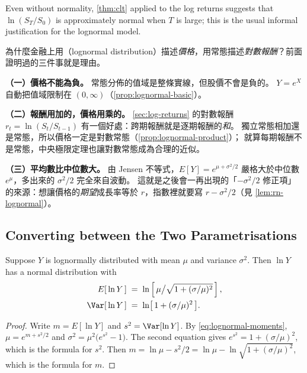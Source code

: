 Even without normality, \autoref{thm:clt} applied to the log returns suggests that $\ln(S_{T}/S_{0})$ is approximately normal when $T$ is large; this is the usual informal justification for the lognormal model.

\begin{remark}
	為什麼金融上用（lognormal distribution）描述\emph{價格}，用常態描述\emph{對數報酬}？前面證明過的三件事就是理由。

	\textbf{（一）價格不能為負。}
	常態分佈的值域是整條實線，但股價不會是負的。
	$Y=e^{X}$ 自動把值域限制在 $(0,\infty)$（\autoref{prop:lognormal-basic}）。

	\textbf{（二）報酬用加的，價格用乘的。}
	\autoref{sec:log-returns} 的對數報酬 $r_{t}=\ln(S_{t}/S_{t-1})$ 有一個好處：跨期報酬就是逐期報酬的\emph{和}。
	獨立常態相加還是常態，所以價格一定是對數常態（\autoref{prop:lognormal-product}）；
	就算每期報酬不是常態，中央極限定理也讓對數常態成為合理的近似。

	\textbf{（三）平均數比中位數大。}
	由 Jensen 不等式，$E[Y]=e^{\mu+\sigma^{2}/2}$ 嚴格大於中位數 $e^{\mu}$，多出來的 $\sigma^{2}/2$ 完全來自波動。
	這就是之後會一再出現的「$-\sigma^{2}/2$ 修正項」的來源：想讓價格的\emph{期望}成長率等於 $r$，指數裡就要寫 $r-\sigma^{2}/2$（見 \autoref{lem:rn-lognormal}）。
\end{remark}
\suppend

\subsection{Converting between the Two Parametrisations}


\begin{proposition}\label{prop:lognormal-inverse}
	Suppose $Y$ is lognormally distributed with mean $\mu$ and variance $\sigma^{2}$.
	Then $\ln Y$ has a normal distribution with
\begin{equation}
		\begin{aligned}
			E[\,\ln Y\,]    & \;=\; \ln\left[\,\mu\big/\sqrt{1+(\sigma/\mu)^{2}}\,\right] , \\
			\Var[\,\ln Y\,] & \;=\; \ln\bigl[\,1+(\sigma/\mu)^{2}\,\bigr] .
		\end{aligned}\label{eq:lognormal-inverse}
	\end{equation}
\end{proposition}

\suppstart
\begin{proof}
	Write $m=E[\ln Y]$ and $s^{2}=\Var[\ln Y]$.
	By \eqref{eq:lognormal-moments}, $\mu=e^{m+s^{2}/2}$ and $\sigma^{2}=\mu^{2}\bigl(e^{s^{2}}-1\bigr)$.
	The second equation gives $e^{s^{2}}=1+(\sigma/\mu)^{2}$, which is the formula for $s^{2}$.
	Then $m=\ln\mu-s^{2}/2=\ln\mu-\ln\sqrt{1+(\sigma/\mu)^{2}}$, which is the formula for $m$.
\end{proof}

